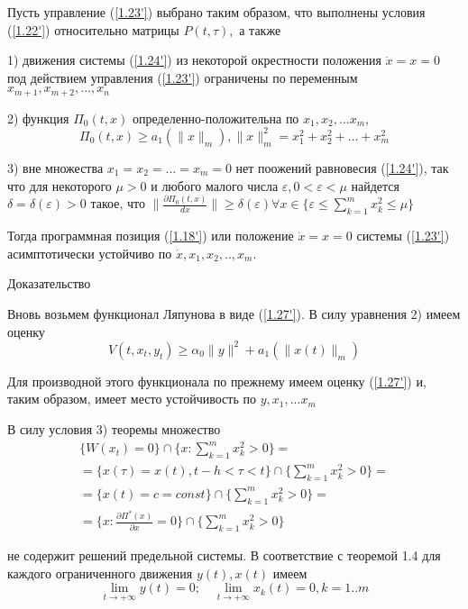\begin{theorem}\label{t-1.9}
Пусть управление (\ref{1.23'}) выбрано таким образом, что выполнены условия (\ref{1.22'}) относительно матрицы $P(t, \tau),$ а также 

1) движения системы (\ref{1.24'}) из некоторой окрестности положения $\dot x = x= 0$ под действием управления (\ref{1.23'}) ограничены по переменным $x_{m+1}, x_{m+2}, ... , x_n$ 

2) функция $\Pi_0 (t, x)$ определенно-положительна по $x_1, x_2, ... x_m$,
$$\Pi_0(t, x) \ge a_1 (\| x \|_m), \| x \|^2_m = x_1^2 + x_2^2 + ... + x_m^2$$

3) вне множества ${x_1 = x_2 = ... = x_m = 0}$ нет поожений равновесия (\ref{1.24'}), так что для некоторого $\mu > 0$ и любого малого числа  $\varepsilon, 0 < \varepsilon < \mu$ найдется $\delta = \delta(\varepsilon) > 0$ такое, что $\| \frac{\partial \Pi_0 (t, x)}{dx} \| \ge \delta(\varepsilon) \forall x \in \lbrace \varepsilon \le \sum_{k = 1}^{m} x_k^2 \le \mu \rbrace$

Тогда программная позиция (\ref{1.18'}) или положение $\dot x = x = 0$ системы (\ref{1.23'}) асимптотически устойчиво по $\dot x, x_1, x_2,.., x_m.$
\end{theorem}

Доказательство 

Вновь возьмем функционал Ляпунова в виде (\ref{1.27'}). В силу уравнения 2) имеем оценку
$$
V(t, x_t, y_t) \ge \alpha_0 \| y \| ^2 + a_1 (\| x(t) \|_m)
$$

Для производной этого функционала по прежнему имеем оценку (\ref{1.27'}) и, таким образом, имеет место устойчивость по $y, x_1, ... x_m$

В силу условия 3) теоремы множество 
$$
\begin{array}{c}
\displaystyle \lbrace W(x_t) = 0 \rbrace \cap \lbrace x : \sum_{k = 1}^{m} x_k^2 > 0 \rbrace =\\
\displaystyle = \lbrace x(\tau) = x(t), t - h < \tau < t \rbrace \cap \lbrace \sum_{k = 1}^{m} x_k^2 > 0 \rbrace =\\
\displaystyle = \lbrace x(t) = c = const \rbrace \cap \lbrace \sum_{k = 1}^{m} x_k^2 > 0 \rbrace =\\
\displaystyle = \lbrace x: \frac{\partial \Pi^{*} (x)}{\partial x} = 0 \rbrace \cap \lbrace \sum_{k = 1}^{m} x_k^2 > 0 \rbrace
\end{array}
$$

не содержит решений предельной системы. В соответствие с теоремой 1.4 для каждого ограниченного движения $y(t), x(t)$ имеем
$$\lim_{t \to + \infty} y(t) = 0; \quad \lim_{t \to + \infty} x_k (t) = 0, k = 1..m$$

